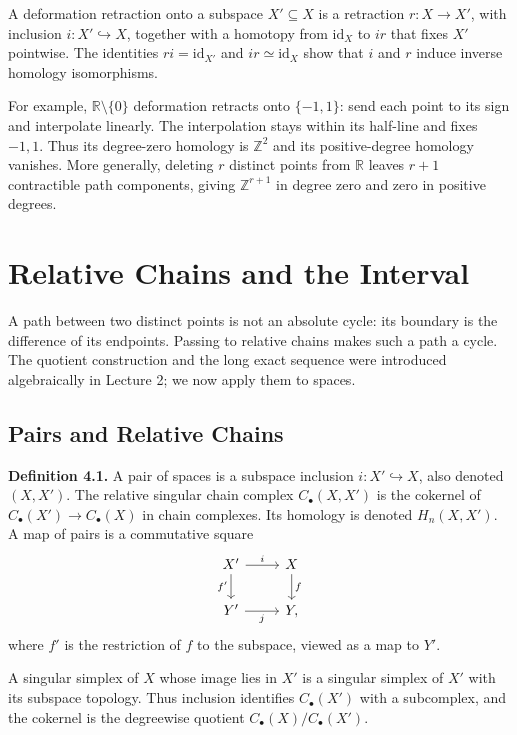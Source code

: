 \documentclass[11pt]{article}
\newcommand{\coursebold}[1]{{\color{burgundy}\textbf{#1}}}
\newcommand{\facehead}[1]{\subsection{#1}}
\begin{document}
A deformation retraction onto a subspace $X'\subseteq X$ is a retraction $r:X\to X'$, with inclusion $i:X'\hookrightarrow X$, together with a homotopy from $\mathrm{id}_X$ to $ir$ that fixes $X'$ pointwise. The identities $ri=\mathrm{id}_{X'}$ and $ir\simeq\mathrm{id}_X$ show that $i$ and $r$ induce inverse homology isomorphisms.

For example, $\mathbb R\setminus\{0\}$ deformation retracts onto $\{-1,1\}$: send each point to its sign and interpolate linearly. The interpolation stays within its half-line and fixes $-1,1$. Thus its degree-zero homology is $\mathbb Z^2$ and its positive-degree homology vanishes. More generally, deleting $r$ distinct points from $\mathbb R$ leaves $r+1$ contractible path components, giving $\mathbb Z^{r+1}$ in degree zero and zero in positive degrees.

\section{Relative Chains and the Interval}
A path between two distinct points is not an absolute cycle: its boundary is the difference of its endpoints. Passing to relative chains makes such a path a cycle. The quotient construction and the long exact sequence were introduced algebraically in Lecture 2; we now apply them to spaces.

\facehead{Pairs and Relative Chains}
\coursebold{Definition 4.1.} A pair of spaces is a subspace inclusion $i:X'\hookrightarrow X$, also denoted $(X,X')$. The relative singular chain complex $C_\bullet(X,X')$ is the cokernel of $C_\bullet(X')\to C_\bullet(X)$ in chain complexes. Its homology is denoted $H_n(X,X')$. A map of pairs is a commutative square
\[
\begin{tikzcd}X'\arrow[r,"i"]\arrow[d,"f'"']&X\arrow[d,"f"]\\Y'\arrow[r,"j"']&Y,\end{tikzcd}
\]
where $f'$ is the restriction of $f$ to the subspace, viewed as a map to $Y'$.

A singular simplex of $X$ whose image lies in $X'$ is a singular simplex of $X'$ with its subspace topology. Thus inclusion identifies $C_\bullet(X')$ with a subcomplex, and the cokernel is the degreewise quotient $C_\bullet(X)/C_\bullet(X')$.
\end{document}

